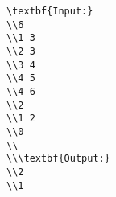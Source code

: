 \begin{verbatim}
\textbf{Input:}
\\6
\\1 3
\\2 3
\\3 4
\\4 5
\\4 6
\\2
\\1 2
\\0
\\
\\\textbf{Output:}
\\2
\\1\end{verbatim}